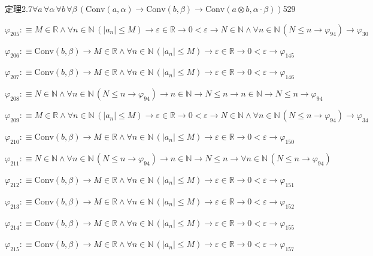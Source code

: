 \begin{fullproof}{定理2.7}{$\forall a\,\forall \alpha\,\forall b\,\forall \beta\,(\mathrm{Conv}(a,\alpha) \to \mathrm{Conv}(b,\beta) \to \mathrm{Conv}(a \otimes b,\alpha \cdot \beta))$}{529}
\begin{abbrevlist}
\item $\varphi_{205} :\equiv M \in \mathbb{R} \land \forall n \in \mathbb{N}\,(\lvert a_{n} \rvert \leq M) \to \varepsilon \in \mathbb{R} \to 0 < \varepsilon \to N \in \mathbb{N} \land \forall n \in \mathbb{N}\,(N \leq n \to \varphi_{94}) \to \varphi_{30}$
\item $\varphi_{206} :\equiv \mathrm{Conv}(b,\beta) \to M \in \mathbb{R} \land \forall n \in \mathbb{N}\,(\lvert a_{n} \rvert \leq M) \to \varepsilon \in \mathbb{R} \to 0 < \varepsilon \to \varphi_{145}$
\item $\varphi_{207} :\equiv \mathrm{Conv}(b,\beta) \to M \in \mathbb{R} \land \forall n \in \mathbb{N}\,(\lvert a_{n} \rvert \leq M) \to \varepsilon \in \mathbb{R} \to 0 < \varepsilon \to \varphi_{146}$
\item $\varphi_{208} :\equiv N \in \mathbb{N} \land \forall n \in \mathbb{N}\,(N \leq n \to \varphi_{94}) \to n \in \mathbb{N} \to N \leq n \to n \in \mathbb{N} \to N \leq n \to \varphi_{94}$
\item $\varphi_{209} :\equiv M \in \mathbb{R} \land \forall n \in \mathbb{N}\,(\lvert a_{n} \rvert \leq M) \to \varepsilon \in \mathbb{R} \to 0 < \varepsilon \to N \in \mathbb{N} \land \forall n \in \mathbb{N}\,(N \leq n \to \varphi_{94}) \to \varphi_{34}$
\item $\varphi_{210} :\equiv \mathrm{Conv}(b,\beta) \to M \in \mathbb{R} \land \forall n \in \mathbb{N}\,(\lvert a_{n} \rvert \leq M) \to \varepsilon \in \mathbb{R} \to 0 < \varepsilon \to \varphi_{150}$
\item $\varphi_{211} :\equiv N \in \mathbb{N} \land \forall n \in \mathbb{N}\,(N \leq n \to \varphi_{94}) \to n \in \mathbb{N} \to N \leq n \to \forall n \in \mathbb{N}\,(N \leq n \to \varphi_{94})$
\item $\varphi_{212} :\equiv \mathrm{Conv}(b,\beta) \to M \in \mathbb{R} \land \forall n \in \mathbb{N}\,(\lvert a_{n} \rvert \leq M) \to \varepsilon \in \mathbb{R} \to 0 < \varepsilon \to \varphi_{151}$
\item $\varphi_{213} :\equiv \mathrm{Conv}(b,\beta) \to M \in \mathbb{R} \land \forall n \in \mathbb{N}\,(\lvert a_{n} \rvert \leq M) \to \varepsilon \in \mathbb{R} \to 0 < \varepsilon \to \varphi_{152}$
\item $\varphi_{214} :\equiv \mathrm{Conv}(b,\beta) \to M \in \mathbb{R} \land \forall n \in \mathbb{N}\,(\lvert a_{n} \rvert \leq M) \to \varepsilon \in \mathbb{R} \to 0 < \varepsilon \to \varphi_{155}$
\item $\varphi_{215} :\equiv \mathrm{Conv}(b,\beta) \to M \in \mathbb{R} \land \forall n \in \mathbb{N}\,(\lvert a_{n} \rvert \leq M) \to \varepsilon \in \mathbb{R} \to 0 < \varepsilon \to \varphi_{157}$

\end{abbrevlist}
\end{fullproof}
